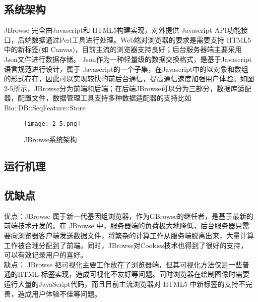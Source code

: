 		\subsection{系统架构}
		JBrowse 完全由Javascript和 HTML5构建实现，对外提供 Javascript API功能接口，后端数据通过Perl工具进行处理。Web端对浏览器的要求是需要支持 HTML5 中的新标签(如 Canvas)，目前主流的浏览器支持良好；后台服务器端主要采用 Json文件进行数据存储。  Json作为一种轻量级的数据交换格式，是基于Javascript语言规范进行设计，属于 Javascript的一个子集，在Javascript中的以对象和数组的形式存在，因此可以实现较快的前后台通信，提高通信速度加强用户体验。如图2-5所示，JBrowse分为前端和后端；在后端JBrowse可以分为三部分，数据库适配器，配置文件，数据管理工具支持多种数据适配器的支持比如Bio::DB::SeqFeature::Store
		\begin{figure}[!ht]
			\centering
			\texttt{[image: 2-5.png]}
			\caption{JBrowse系统架构}
		\end{figure}
		\subsection{运行机理}
		
		\subsection{优缺点}
		优点：JBrowse 属于新一代基因组浏览器，作为GBrowse的继任者，是基于最新的前端技术开发的。在 JBrowse 中，服务器端的负荷极大地降低，后台服务器只需要向浏览器客户端发送数据文件，将繁杂的计算工作从服务端脱离出来，大量计算工作被合理分配到了前端。同时，JBrowse对Cookies技术也得到了很好的支持，可以有效记录用户的喜好。\\
		\indent 缺点： JBrowse 把可视化主要工作放在了浏览器端，但其可视化方法仅是一些普通的HTML 标签实现，造成可视化不友好等问题。同时浏览器在绘制图像时需要运行大量的JavaScript代码，而且目前主流浏览器对 HTML5 中新标签的支持不完善，造成用户体验不佳等问题。
		